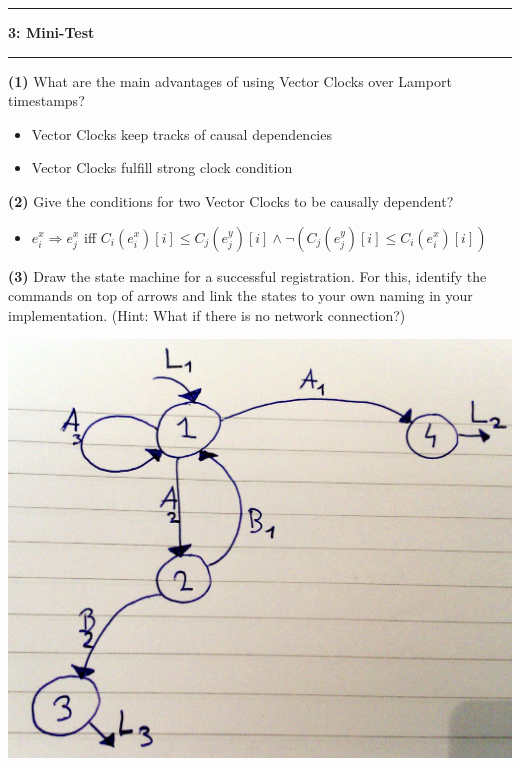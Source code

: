 \documentclass[11pt]{article}
\newcommand\question[2]{\vspace{.25in}\hrule\textbf{#1: #2}\vspace{.5em}\hrule\vspace{.10in}}
\renewcommand\part[1]{\vspace{.10in}\textbf{(#1)}}
\begin{document}
\raggedright

\newcommand\NAME{Lukas Gianinazzi, Young Ban, Vincent Demotz}  %

\question{3}{Mini-Test}

\part{1}
What are the main advantages of using Vector Clocks over Lamport timestamps?


\begin{itemize}
	\item Vector Clocks keep tracks of causal dependencies
	\item Vector Clocks fulfill strong clock condition
\end{itemize}

\part{2}
Give the conditions for two Vector Clocks to be causally dependent?

\begin{itemize}
\item$e^{x}_{i} \Rightarrow e^{x}_{j}$ iff $C_{i} (e^{x}_{i})[i] \leq C_{j} (e^{y}_{j})[i] \wedge 
\neg ( C_{j} (e^{y}_{j})[i] \leq C_{i} (e^{x}_{i})[i])$
\end{itemize}

\clearpage

\part{3}
Draw the state machine for a successful registration. For this, identify the commands on top of
arrows and link the states to your own naming in your implementation. (Hint: What if there is no
network connection?)


\includegraphics[scale=0.15]{registrationStates.jpg}
\end{document}
